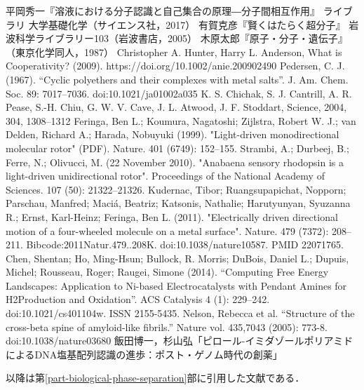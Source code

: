 \documentclass[uplatex, dvipdfmx]{jsreport}
\begin{document}
\begin{thebibliography}{99}
        平岡秀一『溶液における分子認識と自己集合の原理―分子間相互作用』
        ライブラリ 大学基礎化学（サイエンス社，2017）
        有賀克彦『賢くはたらく超分子』
        岩波科学ライブラリー103（岩波書店，2005）
        木原太郎『原子・分子・遺伝子』
        （東京化学同人，1987）
        Christopher A. Hunter, Harry L. Anderson, What is Cooperativity? (2009).
        https://doi.org/10.1002/anie.200902490
        Pedersen, C. J. (1967). “Cyclic polyethers and their complexes with metal salts”. J. Am. Chem. Soc. 89: 7017–7036.
        doi:10.1021/ja01002a035
        K. S. Chichak, S. J. Cantrill, A. R. Pease, S.-H. Chiu, G. W. V. Cave, J. L. Atwood, J. F. Stoddart, Science, 2004, 304, 1308–1312
        Feringa, Ben L.; Koumura, Nagatoshi; Zijlstra, Robert W. J.; van Delden, Richard A.; Harada, Nobuyuki (1999). "Light-driven monodirectional molecular rotor" (PDF). Nature. 401 (6749): 152–155.
        Strambi, A.; Durbeej, B.; Ferre, N.; Olivucci, M. (22 November 2010). "Anabaena sensory rhodopsin is a light-driven unidirectional rotor". Proceedings of the National Academy of Sciences. 107 (50): 21322–21326.
        Kudernac, Tibor; Ruangsupapichat, Nopporn; Parschau, Manfred; Maciá, Beatriz; Katsonis, Nathalie; Harutyunyan, Syuzanna R.; Ernst, Karl-Heinz; Feringa, Ben L. (2011). "Electrically driven directional motion of a four-wheeled molecule on a metal surface". Nature. 479 (7372): 208–211. Bibcode:2011Natur.479..208K. doi:10.1038/nature10587. PMID 22071765.
        Chen, Shentan; Ho, Ming-Hsun; Bullock, R. Morris; DuBois, Daniel L.; Dupuis, Michel; Rousseau, Roger; Raugei, Simone (2014). “Computing Free Energy Landscapes: Application to Ni-based Electrocatalysts with Pendant Amines for H2Production and Oxidation”. ACS Catalysis 4 (1): 229–242. doi:10.1021/cs401104w. ISSN 2155-5435.
        Nelson, Rebecca et al. “Structure of the cross-beta spine of amyloid-like fibrils.” Nature vol. 435,7043 (2005): 773-8. doi:10.1038/nature03680
        飯田博一，杉山弘「ピロール-イミダゾールポリアミドによるDNA塩基配列認識の進歩：ポスト・ゲノム時代の創薬」

    以降は第\ref{part-biological-phase-separation}部に引用した文献である．


\end{thebibliography}
\end{document}
